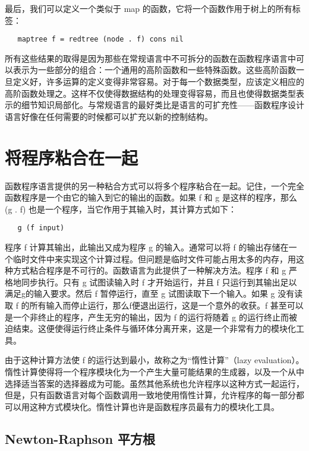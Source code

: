 \documentclass[12pt,a4paper]{article}
\begin{document}
最后，我们可以定义一个类似于 map 的函数，它将一个函数作用于树上的所有标签：

\begin{verbatim}
   maptree f = redtree (node . f) cons nil
\end{verbatim}

所有这些结果的取得是因为那些在常规语言中不可拆分的函数在函数程序语言中可以表示为一些部分的组合：一个通用的高阶函数和一些特殊函数。这些高阶函数一旦定义好，许多运算的定义变得非常容易。对于每一个数据类型，应该定义相应的高阶函数处理之。这样不仅使得数据结构的处理变得容易，而且也使得数据类型表示的细节知识局部化。与常规语言的最好类比是语言的可扩充性——函数程序设计语言好像在任何需要的时候都可以扩充以新的控制结构。

\section{将程序粘合在一起}

函数程序语言提供的另一种粘合方式可以将多个程序粘合在一起。记住，一个完全函数程序是一个由它的输入到它的输出的函数。如果 f 和 g 是这样的程序，那么 (g . f) 也是一个程序，当它作用于其输入时，其计算方式如下：

\begin{verbatim}
   g (f input)
\end{verbatim}

程序 f 计算其输出，此输出又成为程序 g 的输入。通常可以将 f 的输出存储在一个临时文件中来实现这个计算过程。但问题是临时文件可能占用太多的内存，用这种方式粘合程序是不可行的。函数语言为此提供了一种解决方法。程序 f 和 g 严格地同步执行。只有 g 试图读输入时 f 才开始运行，并且 f 只运行到其输出足以满足g的输入要求。然后 f 暂停运行，直至 g 试图读取下一个输入。如果 g 没有读取 f 的所有输入而停止运行，那么f便退出运行，这是一个意外的收获。f 甚至可以是一个非终止的程序，产生无穷的输出，因为 f 的运行将随着 g 的运行终止而被迫结束。这便使得运行终止条件与循环体分离开来，这是一个非常有力的模块化工具。

由于这种计算方法使 f 的运行达到最小，故称之为``惰性计算''（lazy evaluation）。惰性计算使得将一个程序模块化为一个产生大量可能结果的生成器，以及一个从中选择适当答案的选择器成为可能。虽然其他系统也允许程序以这种方式一起运行，但是，只有函数语言对每个函数调用一致地使用惰性计算，允许程序的每一部分都可以用这种方式模块化。惰性计算也许是函数程序员最有力的模块化工具。

\subsection{Newton-Raphson 平方根}
\end{document}
